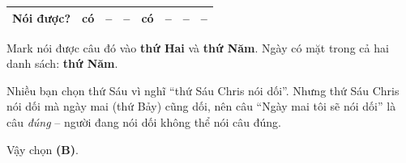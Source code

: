 {\begin{center}
\begin{tabular}{|l|c|c|c|c|c|c|c|}
Nói được? & \textbf{có} & -- & -- & \textbf{có} & -- & -- & -- \\ \hline
\end{tabular}
\end{center}
Mark nói được câu đó vào \textbf{thứ Hai} và \textbf{thứ Năm}.
Ngày có mặt trong cả hai danh sách: \textbf{thứ Năm}.
\begin{warnbox}Nhiều bạn chọn thứ Sáu vì nghĩ ``thứ Sáu Chris nói dối''. Nhưng thứ Sáu Chris nói dối mà ngày mai (thứ Bảy) cũng dối, nên
câu ``Ngày mai tôi sẽ nói dối'' là câu \emph{đúng} -- người đang nói dối không thể nói câu đúng.\end{warnbox}
Vậy chọn \textbf{(B)}.
}

